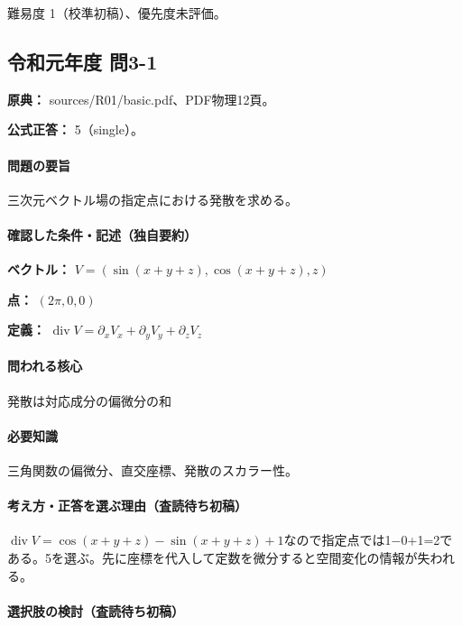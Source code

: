\par 難易度 1（校準初稿）、優先度未評価。

\subsection{令和元年度 問3-1}
\label{q:r01-reg-basic-3-1}

\noindent\textbf{原典：} sources/R01/basic.pdf、PDF物理12頁。

\textbf{公式正答：} 5（single）。

\paragraph{問題の要旨} 三次元ベクトル場の指定点における発散を求める。

\paragraph{確認した条件・記述（独自要約）}\mbox{}\par

\noindent\textbf{ベクトル：} \(V=(\sin(x+y+z),\cos(x+y+z),z)\)\par

\noindent\textbf{点：} \((2\pi,0,0)\)\par

\noindent\textbf{定義：} \(\operatorname{div}V=\partial_xV_x+\partial_yV_y+\partial_zV_z\)\par

\paragraph{問われる核心} 発散は対応成分の偏微分の和

\paragraph{必要知識} 三角関数の偏微分、直交座標、発散のスカラー性。

\paragraph{考え方・正答を選ぶ理由（査読待ち初稿）} \(\operatorname{div}V=\cos(x+y+z)-\sin(x+y+z)+1\)なので指定点では1−0+1=\allowbreak{}2である。5を選ぶ。先に座標を代入して定数を微分すると空間変化の情報が失われる。

\paragraph{選択肢の検討（査読待ち初稿）}\mbox{}\par

